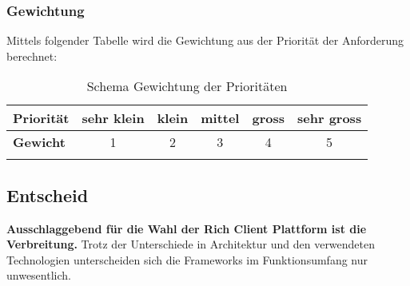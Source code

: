 \subsubsection{Gewichtung}
Mittels folgender Tabelle wird die Gewichtung aus der Priorität der Anforderung berechnet:\begin{longtable}{|l|c|c|c|c|c|}\hline
 \textbf{Priorität} & sehr klein & klein & mittel & gross & sehr gross\\\hline
 \textbf{Gewicht} & 1 & 2 & 3 & 4 & 5\\\hline
 \caption{Schema Gewichtung der Prioritäten}
\end{longtable}


\subsection{Entscheid}\label{rcp_entscheid}
\textbf{Ausschlaggebend für die Wahl der Rich Client Plattform ist die Verbreitung.} Trotz der Unterschiede in Architektur und den verwendeten Technologien unterscheiden sich die Frameworks im Funktionsumfang nur unwesentlich.

